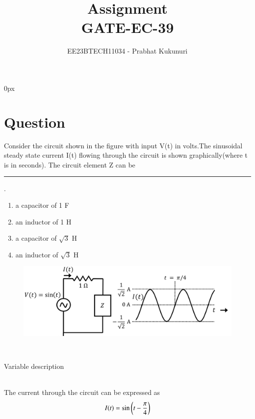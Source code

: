 \documentclass[journal,12pt,twocolumn]{IEEEtran}
\theoremstyle{remark}
\begin{document}
\parindent 0px


\vspace{3cm}

\title{Assignment\\[1ex]GATE-EC-39}
\author{EE23BTECH11034 - Prabhat Kukunuri$^{}$%
}
\maketitle
\newpage
\bigskip

\renewcommand{\thefigure}{\theenumi}
\renewcommand{\thetable}{\theenumi}
\section{Question}
Consider the circuit shown in the figure with input V(t) in volts.The sinusoidal steady state current I(t) flowing through the circuit is shown graphically(where t is in seconds). The circuit element Z can be\rule{1.5cm}{0.15mm}.
\begin{enumerate}
    \item a capacitor of 1 F
    \item an inductor of 1 H
    \item a capacitor of $\sqrt{3}$ H
    \item an inductor of $\sqrt{3}$ H
\end{enumerate}
\begin{figure}[ht]
    \centering
    \includegraphics[width=\columnwidth]{figs/Figure_1.png}
    \label{fig:GATE.2022.EC.39.1}
\end{figure}
\solution\\
\begin{table}[h]
    \centering
    
    \caption{Variable description}
    \label{tab:GATE.2022.EC.39.1}
\end{table}\\
The current through the circuit can be expressed as
\begin{align}
    I(t)=\sin\left(t-\frac{\pi}{4}\right)
\end{align}
\end{document}
